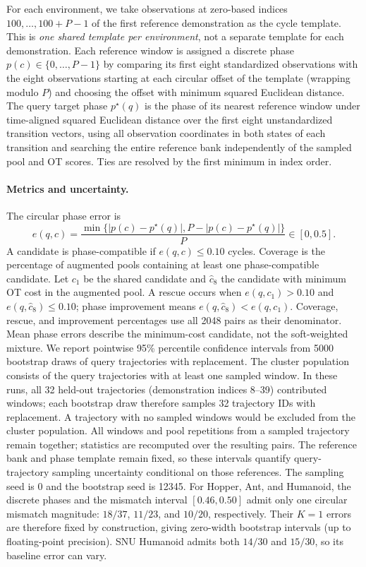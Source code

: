 For each environment, we take observations at zero-based indices
$100,\ldots,100+P-1$ of the first reference demonstration as the cycle
template. This is \emph{one shared template per environment}, not a
separate template for each demonstration. Each reference window is
assigned a discrete phase $p(c)\in\{0,\ldots,P-1\}$ by comparing its
first eight standardized observations with the eight observations
starting at each circular offset of the template (wrapping modulo $P$)
and choosing the offset with minimum squared Euclidean distance.
The query target phase $p^\star(q)$ is the phase of its nearest reference
window under time-aligned squared Euclidean distance over the first
eight unstandardized transition vectors, using all observation coordinates
in both states of each transition and searching the entire
reference bank independently of the sampled pool and OT scores.
Ties are resolved by the first minimum in index order.

\paragraph{Metrics and uncertainty.}
The circular phase error is
\[
 e(q,c)=\frac{\min\{|p(c)-p^\star(q)|,
 P-|p(c)-p^\star(q)|\}}{P}\in[0,0.5].
\]
A candidate is phase-compatible if $e(q,c)\leq0.10$ cycles.
Coverage is the percentage of augmented pools containing at least one
phase-compatible candidate.
Let $c_1$ be the shared candidate and $\hat c_8$ the candidate with
minimum OT cost in the augmented pool. A rescue occurs when
$e(q,c_1)>0.10$ and $e(q,\hat c_8)\leq0.10$; phase improvement means
$e(q,\hat c_8)<e(q,c_1)$. Coverage, rescue, and improvement percentages
use all 2048 pairs as their denominator. Mean phase errors describe
the minimum-cost candidate, not the soft-weighted mixture.
We report pointwise 95\% percentile confidence intervals from 5000
bootstrap draws of query trajectories with replacement. The cluster
population consists of the query trajectories with at least one sampled
window. In these runs, all 32 held-out trajectories (demonstration indices
8--39) contributed windows; each bootstrap draw therefore samples 32
trajectory IDs with replacement. A trajectory with no sampled windows
would be excluded from the cluster population. All windows
and pool repetitions from a sampled trajectory remain together;
statistics are recomputed over the resulting pairs. The reference
bank and phase template remain fixed, so these intervals quantify
query-trajectory sampling uncertainty conditional on those references.
The sampling seed is 0 and the bootstrap seed is 12345.
For Hopper, Ant, and Humanoid, the discrete phases and the mismatch
interval $[0.46,0.50]$ admit only one circular mismatch magnitude:
$18/37$, $11/23$, and $10/20$, respectively. Their $K=1$ errors are
therefore fixed by construction, giving zero-width bootstrap intervals
(up to floating-point precision). SNU Humanoid admits both $14/30$ and
$15/30$, so its baseline error can vary.

